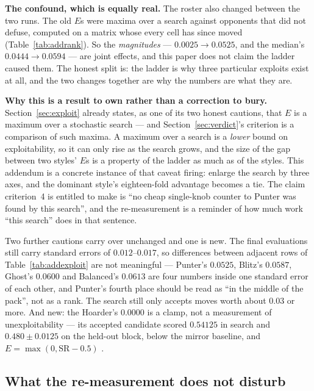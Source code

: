 \documentclass[11pt]{article}
\begin{document}
\textbf{The confound, which is equally real.} The roster also changed between the two runs. The
old $E$s were maxima over a search against opponents that did not defuse, computed on a matrix
whose every cell has since moved (Table~\ref{tab:addrank}). So the \emph{magnitudes} --- $0.0025
\to 0.0525$, and the median's $0.0444 \to 0.0594$ --- are joint effects, and this paper does not
claim the ladder caused them. The honest split is: the ladder is why three particular exploits
exist at all, and the two changes together are why the numbers are what they are.

\textbf{Why this is a result to own rather than a correction to bury.} Section~\ref{sec:exploit}
already states, as one of its two honest cautions, that $E$ is a maximum over a stochastic
search --- and Section~\ref{sec:verdict}'s criterion is a comparison of such maxima. A maximum
over a search is a \emph{lower} bound on exploitability, so it can only rise as the search
grows, and the size of the gap between two styles' $E$s is a property of the ladder as much as
of the styles. This addendum is a concrete instance of that caveat firing: enlarge the search
by three axes, and the dominant style's eighteen-fold advantage becomes a tie. The claim
criterion~4 is entitled to make is ``no cheap single-knob counter to Punter was found by this
search'', and the re-measurement is a reminder of how much work ``this search'' does in that
sentence.

Two further cautions carry over unchanged and one is new. The final evaluations still carry
standard errors of $0.012$--$0.017$, so differences between adjacent rows of
Table~\ref{tab:addexploit} are not meaningful --- Punter's $0.0525$, Blitz's $0.0587$, Ghost's
$0.0600$ and Balanced's $0.0613$ are four numbers inside one standard error of each other, and
Punter's fourth place should be read as ``in the middle of the pack'', not as a rank. The search
still only accepts moves worth about $0.03$ or more. And new: the Hoarder's $0.0000$ is a
clamp, not a measurement of unexploitability --- its accepted candidate scored $0.54125$ in
search and $0.480 \pm 0.0125$ on the held-out block, below the mirror baseline, and
$E = \max(0, \mathrm{SR} - 0.5)$ \cite{artifactv2b}.

\subsection{What the re-measurement does not disturb}
\end{document}
